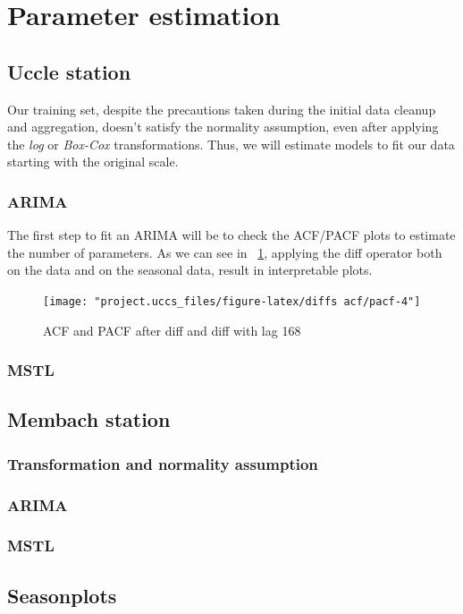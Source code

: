 \documentclass[12pt]{article}
\begin{document}
\newpage
\section{Parameter estimation}
\subsection{Uccle station}
Our training set, despite the precautions taken during the initial data cleanup and aggregation, doesn't satisfy the normality assumption, even after applying the \textit{log} or \textit{Box-Cox} transformations. Thus, we will estimate models to fit our data starting with the original scale.
\subsubsection{ARIMA}
The first step to fit an ARIMA will be to check the ACF/PACF plots to estimate the number of parameters. As we can see in \figurename~\ref{fig:pacf-4}, applying the diff operator both on the data and on the seasonal data, result in interpretable plots.
\begin{figure}[h]
	\centering
	\texttt{[image: "project.uccs\_files/figure-latex/diffs acf/pacf-4"]}
	\caption{ACF and PACF after diff and diff with lag 168}
	\label{fig:pacf-4}
\end{figure}

\subsubsection{MSTL}

\subsection{Membach station}
\subsubsection{Transformation and normality assumption}
\subsubsection{ARIMA}
\subsubsection{MSTL}

\subsection{Seasonplots}
\end{document}
